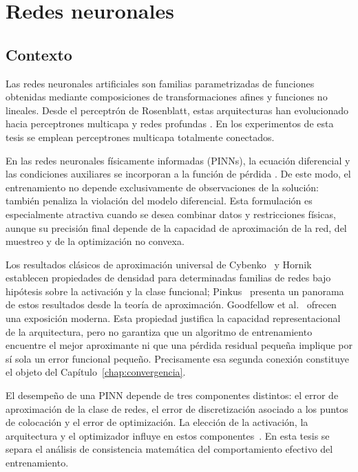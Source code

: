 \chapter{Redes neuronales}
\section{Contexto}

Las redes neuronales artificiales son familias parametrizadas de funciones obtenidas mediante composiciones de transformaciones afines y funciones no lineales. Desde el perceptrón de Rosenblatt, estas arquitecturas han evolucionado hacia perceptrones multicapa y redes profundas \cite{rosenblatt1958perceptron}. En los experimentos de esta tesis se emplean perceptrones multicapa totalmente conectados.

En las redes neuronales físicamente informadas (PINNs), la ecuación diferencial y las condiciones auxiliares se incorporan a la función de pérdida \cite{raissi2017physics}. De este modo, el entrenamiento no depende exclusivamente de observaciones de la solución: también penaliza la violación del modelo diferencial. Esta formulación es especialmente atractiva cuando se desea combinar datos y restricciones físicas, aunque su precisión final depende de la capacidad de aproximación de la red, del muestreo y de la optimización no convexa.

Los resultados clásicos de aproximación universal de Cybenko~\cite{cybenko1989approximation} y Hornik~\cite{hornik1991approximation} establecen propiedades de densidad para determinadas familias de redes bajo hipótesis sobre la activación y la clase funcional; Pinkus~\cite{pinkus1999approximation} presenta un panorama de estos resultados desde la teoría de aproximación. Goodfellow et al.~\cite{goodfellow2016deep} ofrecen una exposición moderna. Esta propiedad justifica la capacidad representacional de la arquitectura, pero no garantiza que un algoritmo de entrenamiento encuentre el mejor aproximante ni que una pérdida residual pequeña implique por sí sola un error funcional pequeño. Precisamente esa segunda conexión constituye el objeto del Capítulo~\ref{chap:convergencia}.

El desempeño de una PINN depende de tres componentes distintos: el error de aproximación de la clase de redes, el error de discretización asociado a los puntos de colocación y el error de optimización. La elección de la activación, la arquitectura y el optimizador influye en estos componentes~\cite{bishop2006pattern,adam2015method,liunocedal1989lbfgs}. En esta tesis se separa el análisis de consistencia matemática del comportamiento efectivo del entrenamiento.

